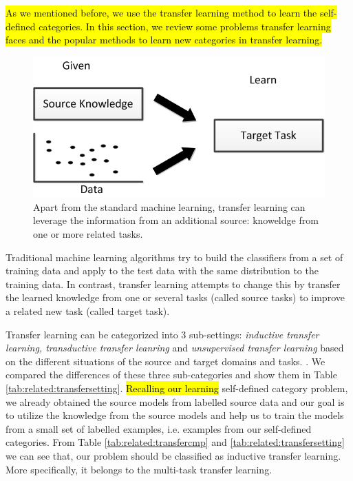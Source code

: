 \hl{As we mentioned before, we use the transfer learning method to learn the self-defined categories. In this section, we review some problems transfer learning faces and the popular methods to learn new categories in transfer learning.} 
\begin{figure}
	\centering
	\includegraphics[scale =.7]{relatedwork/fig/transfer.png}
	\caption{Apart from the standard machine learning, transfer learning can leverage the information from an additional source: knoweldge from one or more related tasks.}
\end{figure}

Traditional machine learning algorithms try to build the classifiers from a set of training data and apply to the test data with the same distribution to the training data. In contrast, transfer learning attempts to change this by transfer the learned knowledge from one or several tasks (called source tasks) to improve a related new task (called target task).

Transfer learning can be categorized into 3 sub-settings: \textit{inductive transfer learning, transductive transfer leanring} and \textit{unsupervised transfer learning} based on the different situations of the source and target domains and tasks. \cite{pan2010survey}. We compared the differences of these three sub-categories and show them in Table \ref{tab:related:transfersetting}. \hl{Recalling our learning} self-defined category problem, we already obtained the source models from labelled source data and our goal is to utilize the knowledge from the source models and help us to train the models from a small set of labelled examples, i.e. examples from our self-defined categories. From Table \ref{tab:related:transfercmp} and \ref{tab:related:transfersetting} we can see that, our problem should be classified as inductive transfer learning. More specifically, it belongs to the multi-task transfer learning.

